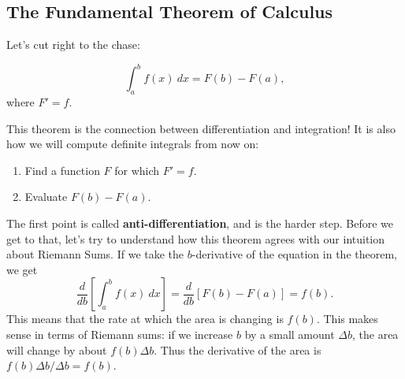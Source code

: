 
\subsection{The Fundamental Theorem of Calculus}

Let's cut right to the chase:

\begin{thm}
    $$\int_a^bf(x)\ dx = F(b)-F(a),$$
    where $F'=f$.
\end{thm}

This theorem is the connection between differentiation and integration! It is also how we will compute definite integrals from now on:
\begin{enumerate}
    \item Find a function $F$ for which $F'=f$.
    \item Evaluate $F(b)-F(a).$
\end{enumerate}

The first point is called \textbf{anti-differentiation}, and is the harder step. Before we get to that, let's try to understand how this theorem agrees with our intuition about Riemann Sums. If we take the $b$-derivative of the equation in the theorem, we get
$$\frac{d}{db}\left[\int_a^{b}f(x)\ dx\right] = \frac{d}{db}\left[F(b)-F(a)\right] = f(b).$$
This means that the rate at which the area is changing is $f(b)$. This makes sense in terms of Riemann sums: if we increase $b$ by a small amount $\Delta b$, the area will change by about $f(b) \Delta b$. Thus the derivative of the area is $f(b)\Delta b/\Delta b = f(b)$. 














